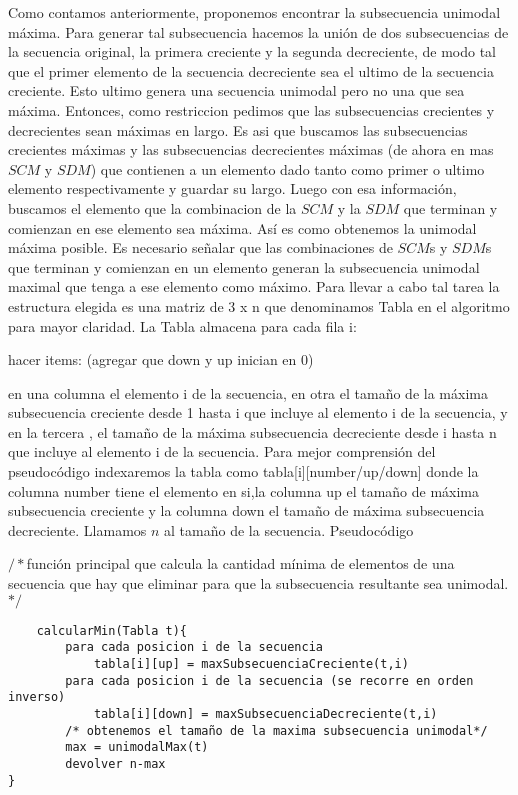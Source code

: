 Como contamos anteriormente, proponemos encontrar la subsecuencia unimodal máxima. Para generar tal subsecuencia hacemos la unión de dos subsecuencias de la secuencia original, la primera creciente y la segunda decreciente, de modo tal que el primer elemento de la secuencia decreciente sea el ultimo de la secuencia creciente. Esto ultimo genera una secuencia unimodal pero no una que sea máxima. Entonces, como restriccion pedimos que las subsecuencias crecientes y decrecientes sean máximas en largo. Es asi que buscamos las subsecuencias crecientes máximas y las subsecuencias decrecientes máximas (de ahora en mas $SCM$ y $SDM$) que contienen a un elemento dado tanto como primer o ultimo elemento respectivamente y guardar su largo. Luego con esa información, buscamos el elemento que la combinacion de la $SCM$ y la $SDM$ que terminan y comienzan en ese elemento sea máxima. Así es como obtenemos la unimodal máxima posible. Es necesario señalar que las combinaciones de $SCM$s y $SDM$s que terminan y comienzan en un elemento generan la subsecuencia unimodal maximal que tenga a ese elemento como máximo.
\newline 
Para llevar a cabo tal tarea la estructura elegida es una matriz de 3 x n que denominamos Tabla en el algoritmo para mayor claridad.
\newline
La Tabla almacena para cada fila i: 

hacer items: (agregar que down y up inician en 0)

en una columna el elemento  i de la secuencia, en otra el tamaño de la máxima subsecuencia creciente desde 1 hasta i que incluye al elemento i de la secuencia, y en la tercera , el tamaño de la máxima subsecuencia decreciente desde  i hasta n que incluye al elemento i de la secuencia.
\newline
Para mejor comprensión del pseudocódigo indexaremos la tabla como tabla[i][number/up/down] donde la columna number  tiene el elemento en si,la columna up el tamaño de máxima subsecuencia creciente y la columna down el tamaño de máxima subsecuencia decreciente. Llamamos $n$ al tamaño de la secuencia.
\newline
Pseudocódigo


$/*$función principal que calcula la cantidad mínima de elementos de una secuencia que hay que eliminar para que la subsecuencia resultante sea unimodal.$*/$
\begin{verbatim}
    calcularMin(Tabla t){
        para cada posicion i de la secuencia
            tabla[i][up] = maxSubsecuenciaCreciente(t,i)
        para cada posicion i de la secuencia (se recorre en orden inverso)
            tabla[i][down] = maxSubsecuenciaDecreciente(t,i)
        /* obtenemos el tamaño de la maxima subsecuencia unimodal*/   
        max = unimodalMax(t)     
        devolver n-max
}
\end{verbatim}

